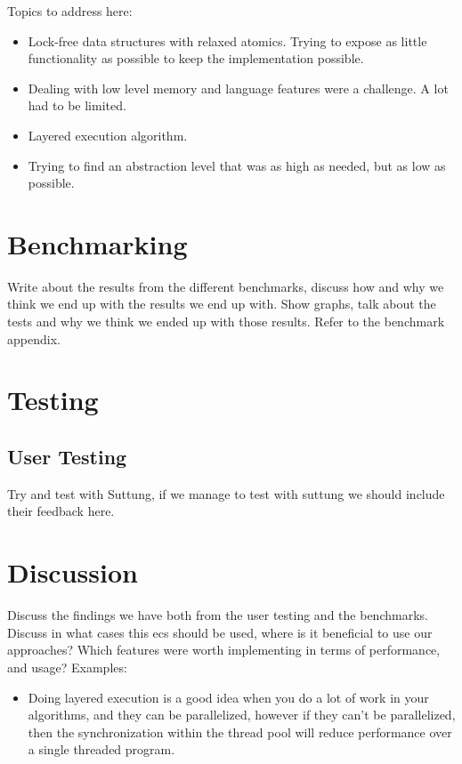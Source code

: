 Topics to address here:
\begin{itemize}
    \item
    Lock-free data structures with relaxed atomics. Trying to expose as little functionality as possible to keep the implementation possible.

    \item
    Dealing with low level memory and language features were a challenge. A lot had to be limited.

    \item
    Layered execution algorithm.

    \item
    Trying to find an abstraction level that was as high as needed, but as low as possible.
\end{itemize}

\chapter{Benchmarking}
\label{chap:benchmarking}
Write about the results from the different benchmarks,
discuss how and why we think we end up with the results we end up with.
Show graphs, talk about the tests and why we think we ended up with those results.
Refer to the benchmark appendix.

\chapter{Testing}
\label{chap:testing}

\section{User Testing}
Try and test with Suttung, if we manage to test with suttung
we should include their feedback here.

\chapter{Discussion}
\label{chap:discussion}
Discuss the findings we have both from the user testing and the benchmarks.
Discuss in what cases this ecs should be used, where is it beneficial to use our approaches?
Which features were worth implementing in terms of performance,
and usage?
Examples:
\begin{itemize}
    \item
    Doing layered execution is a good idea when you do a lot of work in your algorithms, and they can be parallelized,
    however if they can't be parallelized, then the synchronization within the thread pool will reduce performance over a single threaded program.
\end{itemize}

